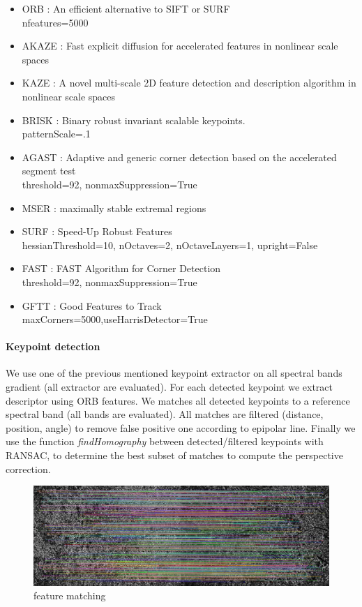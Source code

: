 \documentclass[]{elsarticle}
\begin{document}
	\begin{itemize}
		\item ORB : An efficient alternative to SIFT or SURF \\ nfeatures=5000
		\item AKAZE : Fast explicit diffusion for accelerated features in nonlinear scale spaces
		\item KAZE : A novel multi-scale 2D feature detection and description algorithm in nonlinear scale spaces \cite{rs10050756}
		\item BRISK : Binary robust invariant scalable keypoints. \\ patternScale=.1
		\item AGAST : Adaptive and generic corner detection based on the accelerated segment test \\ threshold=92, nonmaxSuppression=True
		\item MSER : maximally stable extremal regions
		\item SURF : Speed-Up Robust Features \\ hessianThreshold=10, nOctaves=2, nOctaveLayers=1, upright=False
		\item FAST : FAST Algorithm for Corner Detection \\  threshold=92, nonmaxSuppression=True
		\item GFTT : Good Features to Track \\ maxCorners=5000,useHarrisDetector=True
	\end{itemize}
	
	\paragraph{Keypoint detection}
	We use one of the previous mentioned keypoint extractor on all spectral bands gradient (all extractor are evaluated).
	For each detected keypoint we extract descriptor using ORB features.
	We matches all detected keypoints to a reference spectral band (all bands are evaluated).
	All matches are filtered (distance, position, angle) to remove false positive one according to epipolar line.
	Finally we use the function \textit{findHomography} between detected/filtered keypoints with RANSAC,
	to determine the best subset of matches to compute the perspective correction.
	
	\begin{figure}[!htb]
		\centering
		\includegraphics[width=0.7\linewidth]{../figures/prespective-feature-matching.jpg}
		\caption{feature matching}
		\label{fig:feature-matching}
	\end{figure}
	
\end{document}
